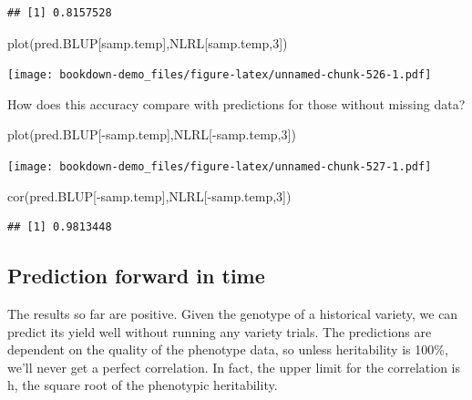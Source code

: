 \documentclass[
]{book}
\newenvironment{Shaded}{\begin{snugshade}}{\end{snugshade}}
\newcommand{\DecValTok}[1]{\textcolor[rgb]{0.00,0.00,0.81}{#1}}
\newcommand{\FunctionTok}[1]{\textcolor[rgb]{0.00,0.00,0.00}{#1}}
\newcommand{\NormalTok}[1]{#1}
\newcommand{\SpecialCharTok}[1]{\textcolor[rgb]{0.00,0.00,0.00}{#1}}
\begin{document}
\begin{verbatim}
## [1] 0.8157528
\end{verbatim}

\begin{Shaded}
\begin{Highlighting}[]
\FunctionTok{plot}\NormalTok{(pred.BLUP[samp.temp],NLRL[samp.temp,}\DecValTok{3}\NormalTok{])}
\end{Highlighting}
\end{Shaded}

\texttt{[image: bookdown-demo\_files/figure-latex/unnamed-chunk-526-1.pdf]}

How does this accuracy compare with predictions for those without missing data?

\begin{Shaded}
\begin{Highlighting}[]
\FunctionTok{plot}\NormalTok{(pred.BLUP[}\SpecialCharTok{{-}}\NormalTok{samp.temp],NLRL[}\SpecialCharTok{{-}}\NormalTok{samp.temp,}\DecValTok{3}\NormalTok{])}
\end{Highlighting}
\end{Shaded}

\texttt{[image: bookdown-demo\_files/figure-latex/unnamed-chunk-527-1.pdf]}

\begin{Shaded}
\begin{Highlighting}[]
\FunctionTok{cor}\NormalTok{(pred.BLUP[}\SpecialCharTok{{-}}\NormalTok{samp.temp],NLRL[}\SpecialCharTok{{-}}\NormalTok{samp.temp,}\DecValTok{3}\NormalTok{])}
\end{Highlighting}
\end{Shaded}

\begin{verbatim}
## [1] 0.9813448
\end{verbatim}

\hypertarget{prediction-forward-in-time}{%
\subsection{Prediction forward in time}\label{prediction-forward-in-time}}

The results so far are positive. Given the genotype of a historical variety, we can predict its yield well without running any variety trials. The predictions are dependent on the quality of the phenotype data, so unless heritability is 100\%, we'll never get a perfect correlation. In fact, the upper limit for the correlation is h, the square root of the phenotypic heritability.
\end{document}
